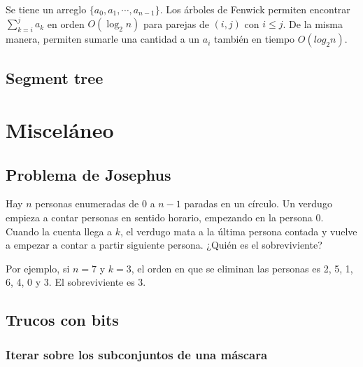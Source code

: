 \documentclass[10pt,letterpaper,twocolumn]{article}
\newcommand{\codigofuente}[1]{

\dotfill
}
\begin{document}
Se tiene un arreglo $\{a_0, a_1, \cdots, a_{n-1}\}$. Los árboles
de Fenwick permiten encontrar $ \displaystyle \sum_{k=i}^{j} a_k $ en orden $O(\log_{2}{n})$ para parejas de $(i, j)$ con $i \leq j$. De la misma manera, permiten sumarle una cantidad a un $a_i$ también en tiempo $O(log_{2}{n})$.
\medskip
\codigofuente{./src/estructuras/fenwick.cpp}

\subsection{Segment tree}
\codigofuente{./src/estructuras/segment_tree.cpp}

\section{Misceláneo}

\subsection{Problema de Josephus}

Hay $n$ personas enumeradas de $0$ a $n - 1$ paradas en un círculo. Un verdugo empieza a contar personas en sentido horario, empezando en la persona $0$. Cuando la cuenta llega a $k$, el verdugo mata a la última persona contada y vuelve a empezar a contar a partir siguiente persona. ¿Quién es el sobreviviente?

Por ejemplo, si $n = 7$ y $k = 3$, el orden en que se eliminan las personas es 2, 5, 1, 6, 4, 0 y 3. El sobreviviente es 3.

\codigofuente{./src/misc/josephus.cpp}

\subsection{Trucos con bits}
\subsubsection{Iterar sobre los subconjuntos de una máscara}

\codigofuente{./src/misc/subsets_of_mask.cpp}
\end{document}
